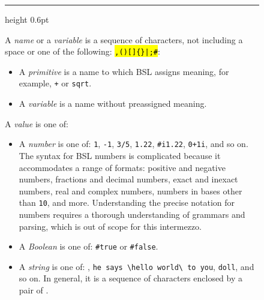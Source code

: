 \begin{figure}[htbp]
  \centering
  \begin{minipage}{\linewidth}
    \hrule height 0.6pt
    \vspace{4pt}
    \footnotesize\raggedright
    A \textit{name} or a \textit{variable} is a sequence of characters, not including a space or one of the following:
    \hl{\texttt{\textquotedbl}}\hspace{1pt}\hl{\texttt{,}}\hspace{1pt}\hl{\texttt{\textquotesingle}}\hspace{1pt}\hl{\texttt{\textasciigrave}}\hspace{1pt}\hl{\texttt{(}}\hspace{1pt}\hl{\texttt{)}}\hspace{1pt}\hl{\texttt{[}}\hspace{1pt}\hl{\texttt{]}}\hspace{1pt}\hl{\texttt{\{}}\hspace{1pt}\hl{\texttt{\}}}\hspace{1pt}\hl{\texttt{|}}\hspace{1pt}\hl{\texttt{;}}\hspace{1pt}\hl{\texttt{\#}}:
    \begin{itemize}[leftmargin=1.4em, itemsep=1.5pt, parsep=0pt, topsep=2pt]
      \item A \textit{primitive} is a name to which BSL assigns meaning, for example, \texttt{+} or \texttt{sqrt}.
      \item A \textit{variable} is a name without preassigned meaning.
    \end{itemize}
    \vspace{2pt}
    A \textit{value} is one of:
    \begin{itemize}[leftmargin=1.4em, itemsep=1.5pt, parsep=0pt, topsep=2pt]
      \item A \textit{number} is one of: \texttt{1}, \texttt{-1}, \texttt{3/5}, \texttt{1.22}, \texttt{\#i1.22}, \texttt{0+1i}, and so on. The syntax for BSL numbers is complicated because it accommodates a range of formats: positive and negative numbers, fractions and decimal numbers, exact and inexact numbers, real and complex numbers, numbers in bases other than \texttt{10}, and more. Understanding the precise notation for numbers requires a thorough understanding of grammars and parsing, which is out of scope for this intermezzo.
      \item A \textit{Boolean} is one of: \texttt{\#true} or \texttt{\#false}.
      \item A \textit{string} is one of: \texttt{\textquotedbl\textquotedbl}, \texttt{\textquotedbl he says \textbackslash\textquotedbl hello world\textbackslash\textquotedbl\ to you\textquotedbl}, \texttt{\textquotedbl doll\textquotedbl}, and so on. In general, it is a sequence of characters enclosed by a pair of \hl{\texttt{\textquotedbl}}.

\end{itemize}
\end{minipage}
\end{figure}
